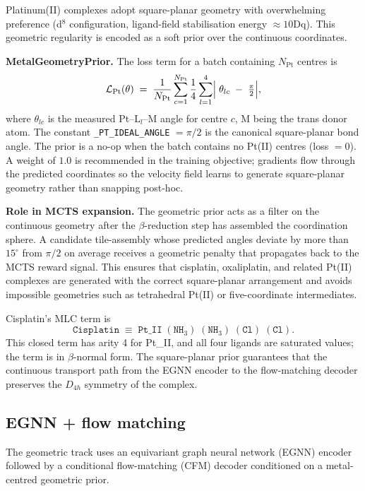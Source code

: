 \documentclass[10pt]{article}
\begin{document}
Platinum(II) complexes adopt square-planar geometry with overwhelming
preference (d$^8$ configuration, ligand-field stabilisation energy
$\approx10\text{Dq}$).  This geometric regularity is encoded as a soft prior
over the continuous coordinates.

\medskip\noindent\textbf{MetalGeometryPrior.}
The loss term for a batch containing $N_{\text{Pt}}$ centres is
\[
  \mathcal{L}_{\text{Pt}}(\theta)
  \;=\;
  \frac{1}{N_{\text{Pt}}}
  \sum_{c=1}^{N_{\text{Pt}}}
  \frac{1}{4}\sum_{l=1}^{4}
  \Bigl|\;\theta_{lc} \;-\; \tfrac{\pi}{2}\Bigr| ,
\]
where $\theta_{lc}$ is the measured Pt--L$_l$--M angle for centre $c$, M being
the trans donor atom.  The constant \texttt{\_PT\_IDEAL\_ANGLE} $= \pi/2$ is the
canonical square-planar bond angle.  The prior is a no-op when the batch
contains no Pt(II) centres (loss $=0$).  A weight of $1.0$ is recommended in
the training objective; gradients flow through the predicted coordinates so the
velocity field learns to generate square-planar geometry rather than snapping
post-hoc.

\medskip\noindent\textbf{Role in MCTS expansion.}
The geometric prior acts as a filter on the continuous geometry after the
$\beta$-reduction step has assembled the coordination sphere.  A candidate
tile-assembly whose predicted angles deviate by more than $15^\circ$ from
$\pi/2$ on average receives a geometric penalty that propagates back to the
MCTS reward signal.  This ensures that cisplatin, oxaliplatin, and related
Pt(II) complexes are generated with the correct square-planar arrangement and
avoids impossible geometries such as tetrahedral Pt(II) or five-coordinate
intermediates.

Cisplatin's MLC term is
\[
  \texttt{Cisplatin}
  \;\equiv\;
  \texttt{Pt\_II}\;(\texttt{NH}_3)\;(\texttt{NH}_3)\;(\texttt{Cl})\;(\texttt{Cl}) .
\]
This closed term has arity 4 for Pt\_II, and all four ligands are saturated
values; the term is in $\beta$-normal form.  The square-planar prior guarantees
that the continuous transport path from the EGNN encoder to the flow-matching
decoder preserves the $D_{4h}$ symmetry of the complex.

\subsection{EGNN + flow matching}

The geometric track uses an equivariant graph neural network (EGNN) encoder
followed by a conditional flow-matching (CFM) decoder conditioned on a
metal-centred geometric prior.
\end{document}
